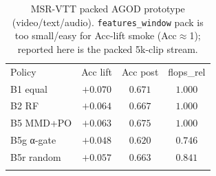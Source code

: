 \begin{table}[t]
\centering
\caption{MSR-VTT packed AGOD prototype (video/text/audio).
\texttt{features\_window} pack is too small/easy for Acc-lift smoke (Acc$\approx$1);
reported here is the packed 5k-clip stream.}
\label{tab:agod-msrvtt-b5r}
\begin{tabular}{lccc}
\agodtoprule
Policy & Acc lift & Acc post & flops\_rel \\
\agodmidrule
B1 equal   & $+0.070$ & $0.671$ & $1.000$ \\
B2 RF      & $+0.064$ & $0.667$ & $1.000$ \\
B5 MMD+PO  & $+0.063$ & $0.675$ & $1.000$ \\
B5g α-gate & $+0.048$ & $0.620$ & $0.746$ \\
B5r random & $+0.057$ & $0.663$ & $0.841$ \\
\agodbottomrule
\end{tabular}
\end{table}

